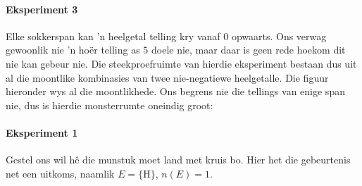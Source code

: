 \paragraph{Eksperiment 3} Elke sokkerspan kan 'n heelgetal telling kry vanaf $0$ opwaarts. Ons verwag gewoonlik nie 'n ho\"er telling as $5$ doele nie, maar daar is geen rede hoekom dit nie kan gebeur nie. Die steekproefruimte van hierdie eksperiment bestaan dus uit al die moontlike kombinasies van twee nie-negatiewe heelgetalle. Die figuur hieronder wys al die moontlikhede. Ons begrens nie die tellings van enige span nie, dus is hierdie monsterrumte oneindig groot:

\begin{figure}[h]
\begin{center}
\end{center}
\end{figure}


\paragraph{Eksperiment 1} Gestel ons wil h\^e die munstuk moet land met kruis bo. Hier het die gebeurtenis net een uitkoms, naamlik
\(E=\{\mbox{H}\}\), \(n(E)=1\).


